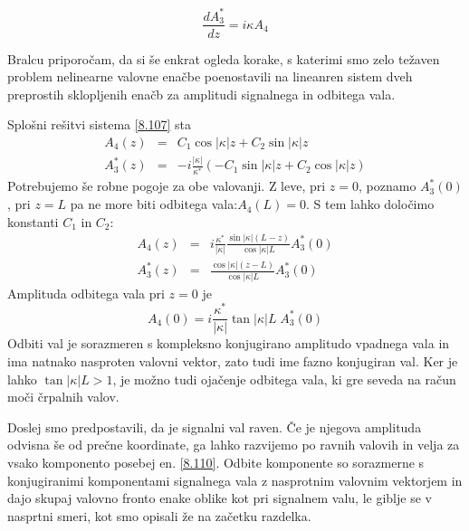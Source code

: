 \documentclass[11pt,fleqn]{book} %
\begin{document}
\begin{equation}
\frac{dA_{3}^{*}}{dz}=i\kappa A_{4}\label{8.107}
\end{equation}


Bralcu priporočam, da si še enkrat ogleda korake, s katerimi smo zelo
težaven problem nelinearne valovne enačbe poenostavili na lineanren
sistem dveh preprostih sklopljenih enačb za amplitudi signalnega in
odbitega vala.

Splošni rešitvi sistema \ref{8.107} sta 
\begin{eqnarray}
A_{4}\left(z\right) & = & C_{1}\cos\left|\kappa\right|z+C_{2}\sin\left|\kappa\right|z\label{8.108}\\
A_{3}^{*}\left(z\right) & = & -i\frac{\left|\kappa\right|}{\kappa^{*}}\left(-C_{1}\sin\left|\kappa\right|z+C_{2}\cos\left|\kappa\right|z\right)\nonumber 
\end{eqnarray}
 Potrebujemo še robne pogoje za obe valovanji. Z leve, pri $z=0$,
poznamo $A_{3}^{*}\left(0\right)$, pri $z=L$ pa ne more biti odbitega
vala:$A_{4}\left(L\right)=0$. S tem lahko določimo konstanti $C_{1}$
in $C_{2}$: 
\begin{eqnarray}
A_{4}\left(z\right) & = & i\frac{\kappa^{*}}{\left|\kappa\right|}\frac{\sin\left|\kappa\right|\left(L-z\right)}{\cos\left|\kappa\right|L}A_{3}^{*}\left(0\right)\label{8.109}\\
A_{3}^{*}\left(z\right) & = & \frac{\cos\left|\kappa\right|\left(z-L\right)}{\cos\left|\kappa\right|L}A_{3}^{*}\left(0\right)\nonumber 
\end{eqnarray}
 Amplituda odbitega vala pri $z=0$ je 
\begin{equation}
A_{4}\left(0\right)=i\frac{\kappa^{*}}{\left|\kappa\right|}\tan\left|\kappa\right|L\; A_{3}^{*}\left(0\right)\label{8.110}
\end{equation}
 Odbiti val je sorazmeren s kompleksno konjugirano amplitudo vpadnega
vala in ima natnako nasproten valovni vektor, zato tudi ime fazno
konjugiran val. Ker je lahko $\tan\left|\kappa\right|L>1$, je možno
tudi ojačenje odbitega vala, ki gre seveda na račun moči črpalnih
valov.

Doslej smo predpostavili, da je signalni val raven. Če je njegova
amplituda odvisna še od prečne koordinate, ga lahko razvijemo po ravnih
valovih in velja za vsako komponento posebej en. \ref{8.110}. Odbite
komponente so sorazmerne s konjugiranimi komponentami signalnega vala
z nasprotnim valovnim vektorjem in dajo skupaj valovno fronto enake
oblike kot pri signalnem valu, le giblje se v nasprtni smeri, kot
smo opisali že na začetku razdelka.
\end{document}
